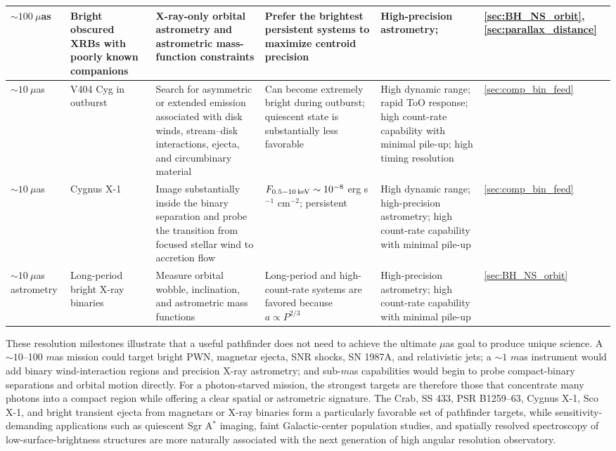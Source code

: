 \documentclass{article}
\begin{document}
\begin{table}
{\begin{tabular}{L{2.2cm} L{2.5cm} L{4.0cm} L{3.5cm} L{4.2cm} L{1.5cm}}
$\sim100~\mu$as &
Bright obscured XRBs with poorly known companions &
X-ray-only orbital astrometry and astrometric mass-function constraints &
Prefer the brightest persistent systems to maximize centroid precision &
High-precision astrometry; &
\ref{sec:BH_NS_orbit}, \ref{sec:parallax_distance} \\ \hline

$\sim10~\mu$as &
V404 Cyg in outburst &
Search for asymmetric or extended emission associated with disk winds, stream--disk interactions, ejecta, and circumbinary material &
Can become extremely bright during outburst; quiescent state is substantially less favorable &
High dynamic range; rapid ToO response; high count-rate capability with minimal pile-up; high timing resolution &
\ref{sec:comp_bin_feed} \\

$\sim10~\mu$as &
Cygnus X-1 &
Image substantially inside the binary separation and probe the transition from focused stellar wind to accretion flow &
$F_{0.5-10\,{\rm keV}}\sim10^{-8}$ erg s$^{-1}$ cm$^{-2}$; persistent &
High dynamic range; high-precision astrometry; high count-rate capability with minimal pile-up &
\ref{sec:comp_bin_feed} \\

$\sim10~\mu$as astrometry &
Long-period bright X-ray binaries &
Measure orbital wobble, inclination, and astrometric mass functions &
Long-period and high-count-rate systems are favored because $a\propto P^{2/3}$ &
High-precision astrometry; high count-rate capability with minimal pile-up &
\ref{sec:BH_NS_orbit} \\

\hline
\end{tabular}
}
\end{table}


These resolution milestones illustrate that a useful pathfinder does not need to achieve the ultimate $\mu$as goal to produce unique science. A $\sim10$--100 $m$as mission could target bright PWN, magnetar ejecta, SNR shocks, SN 1987A, and relativistic jets; a $\sim1$ $m$as instrument would add binary wind-interaction regions and precision X-ray astrometry; and sub-$m$as capabilities would begin to probe compact-binary separations and orbital motion directly. For a photon-starved mission, the strongest targets are therefore those that concentrate many photons into a compact region while offering a clear spatial or astrometric signature. The Crab, SS 433, PSR B1259--63, Cygnus X-1, Sco X-1, and bright transient ejecta from magnetars or X-ray binaries form a particularly favorable set of pathfinder targets, while sensitivity-demanding applications such as quiescent Sgr A$^*$ imaging, faint Galactic-center population studies, and spatially resolved spectroscopy of low-surface-brightness structures are more naturally associated with the next generation of high angular resolution observatory.
\end{document}
